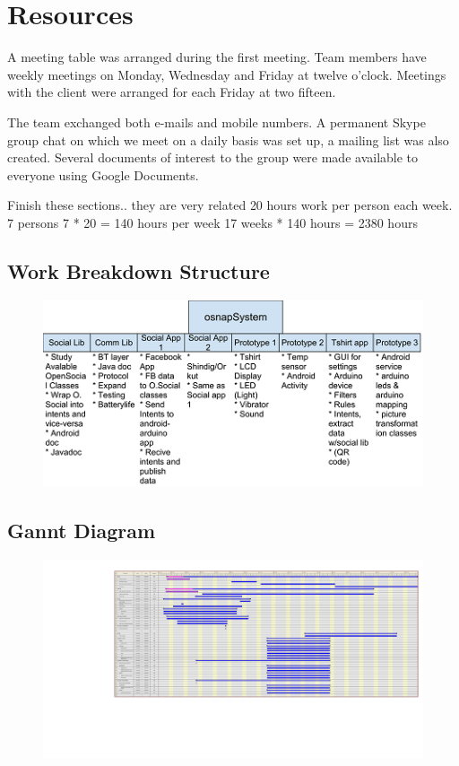 \newpage
\section{Resources}
A meeting table was arranged during the first meeting. Team members
have weekly meetings on Monday, Wednesday and Friday at twelve o'clock.
Meetings with the client were arranged for each Friday at two fifteen.

The team exchanged both e-mails and mobile numbers. A permanent Skype
group chat on which we meet on a daily basis was set up, a mailing
list was also created. Several documents of interest to the group
were made available to everyone using Google Documents.

\todo
{
 Finish these sections.. they are very related
}
20 hours work per person each week.
7 persons
7 * 20 = 140 hours per week
17 weeks * 140 hours = 2380 hours

\subsection{Work Breakdown Structure}

\begin{figure}[h]
\centering \includegraphics{img/mgmt-wbs.png}
\label{fig:mgmt-wbs}
\end{figure}


\subsection{Gannt Diagram}

\begin{figure}[h]
\centering \includegraphics{img/mgmt-gantt.pdf}
\label{fig:mgmt-gantt}
\end{figure}


